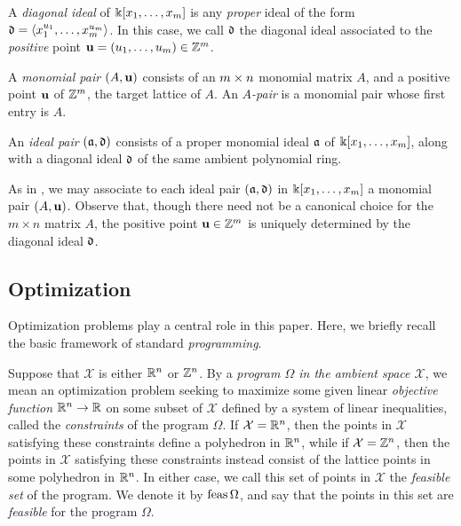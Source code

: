 \documentclass{amsart}
\begin{document}
\begin{definition}
   A  \emph{diagonal ideal} of $\Bbbk[x_1, \ldots, x_{m}]$ is any \emph{proper} ideal of the form $\mathfrak{d} = \langle x_1^{u_1}, \ldots, x_{m}^{u_{m}} \rangle$.
   In this case,  we call $\mathfrak{d}$ the diagonal ideal associated to the \emph{positive} point $\mathbf{u} = (u_1, \ldots, u_{m}) \in \mathbb{Z}^{m}$.
\end{definition}

\begin{definition}[Pairs]
\label{pairs: D}
   A \emph{monomial pair} $(A, \mathbf{u})$ consists of an $m \times n$ monomial matrix $A$, and a positive point $\mathbf{u}$ of $\mathbb{Z}^m$, the target lattice of $A$.
    An \emph{$A$-pair} is a monomial pair whose first entry is $A$.

   An \emph{ideal pair} $(\mathfrak{a}, \mathfrak{d})$ consists of a proper monomial ideal $\mathfrak{a}$ of $\Bbbk[x_1, \ldots, x_{m}]$, along with a diagonal ideal $\mathfrak{d}$ of the same ambient polynomial ring.
\end{definition}

\begin{remark}
\label{associate of pairs: R}
 As in , we may associate to each ideal pair $(\mathfrak{a}, \mathfrak{d})$ in $\Bbbk[x_1, \ldots, x_{m}]$ a monomial pair $(A, \mathbf{u})$.  Observe that, though there need not be a canonical choice for the $m \times n$ matrix $A$, the positive point $\mathbf{u} \in \mathbb{Z}^m$ is uniquely determined by the diagonal ideal $\mathfrak{d}$.
\end{remark}

\subsection{Optimization} \label{optimization: S}  Optimization problems play a central role in this paper.  Here, we briefly recall the basic framework of standard \emph{programming}.

Suppose that $\mathcal{X}$ is either $\mathbb{R}^n$ or $\mathbb{Z}^n$.  By a \emph{program $\Omega$ in the ambient space $\mathcal{X}$}, we mean an optimization problem seeking to maximize some given linear \emph{objective function} $\mathbb{R}^n \to \mathbb{R}$ on some subset of $\mathcal{X}$ defined by a system of linear inequalities, called the \emph{constraints} of the program $\Omega$. If $\mathcal{X} = \mathbb{R}^n$, then the points in $\mathcal{X}$ satisfying these constraints define a polyhedron in $\mathbb{R}^n$, while if $\mathcal{X} = \mathbb{Z}^n$, then the points in $\mathcal{X}$ satisfying these constraints instead consist of the lattice points in some polyhedron in $\mathbb{R}^n$.  In either case, we call this set of points in $\mathcal{X}$ the \emph{feasible set} of the program.  We denote it by $\operatorname{feas} \Omega$, and say that the points in this set are \emph{feasible} for the program $\Omega$.
\end{document}
